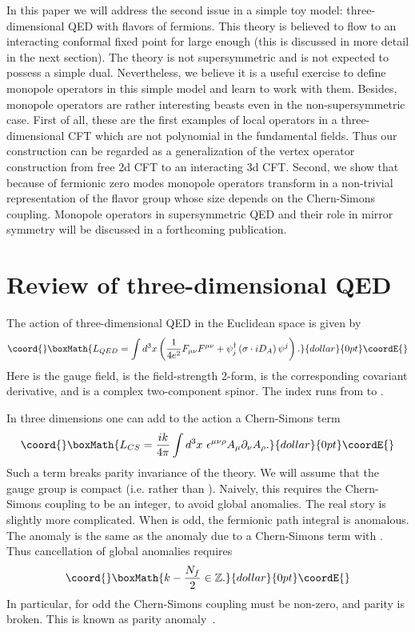 \documentclass[a4paper,12pt, amsfonts, amssymb]{article}
\providecommand{\RR}{{\mathbb R}}
\providecommand{\ZZ}{{\mathbb Z}}
\providecommand{\eps}{\epsilon}
\begin{document}
In this paper we will address the second issue in a simple toy 
model: three-dimensional QED with \coordHE{} flavors of fermions. 
This theory is believed to flow to an interacting conformal
fixed point for large enough \coordHE{} (this is discussed in more detail in the
next section). The theory is not supersymmetric and is not expected to
possess a simple dual. Nevertheless, we believe it is a useful
exercise to define monopole operators in this simple model
and learn to work with them. Besides, monopole operators
are rather interesting beasts even in the non-supersymmetric
case. First of all, these are the first examples of local operators
in a three-dimensional CFT which are not polynomial in the fundamental
fields. Thus our construction can be regarded as a generalization of the
vertex operator construction from free 2d CFT to an interacting
3d CFT. Second, we show that because of fermionic zero modes
monopole operators transform in a non-trivial
representation of the flavor group whose size depends on the Chern-Simons
coupling. Monopole operators in supersymmetric QED and their role
in mirror symmetry will be discussed in a forthcoming publication.

\section{Review of three-dimensional QED}

The action of three-dimensional QED in the Euclidean space is given by
$$\coord{}\boxMath{
L_{QED}=\int d^3 x \left(\frac{1}{4e^2} F_{\mu\nu} F^{\mu\nu} +
\psi^\dagger_j \left(\sigma \cdot iD_A\right) \psi^j\right).
}{dollar}{0pt}\coordE{}$$
Here \coordHE{} is the \coordHE{} gauge field, \coordHE{} is the field-strength 2-form,
\coordHE{} is the corresponding covariant derivative,
and \coordHE{} is a complex two-component spinor. The index \coordHE{} runs from 
\coordHE{} to \coordHE{}. 

In three dimensions one can add to the action a Chern-Simons term
$$\coord{}\boxMath{
L_{CS}=\frac{ik}{4\pi} \int d^3 x\ \eps^{\mu\nu\rho} A_\mu 
\partial_\nu A_\rho.
}{dollar}{0pt}\coordE{}$$
Such a term breaks parity invariance of the theory.
We will assume that the gauge group is compact (i.e.
\coordHE{} rather than \myHighlight{$\RR$}\coordHE{}). Naively, this requires the Chern-Simons
coupling \coordHE{} to be an integer, to avoid global anomalies. The real
story is slightly more complicated. When \coordHE{} is odd, the fermionic path
integral is anomalous. The anomaly is the same as the anomaly due
to a Chern-Simons term with \coordHE{}. Thus cancellation of global
anomalies requires
$$\coord{}\boxMath{
k-\frac{N_f}{2}\in \ZZ.
}{dollar}{0pt}\coordE{}$$
In particular, for odd \coordHE{} the Chern-Simons coupling must be non-zero,
and parity is broken. This is known as parity anomaly~\cite{Redlich}.
\end{document}
